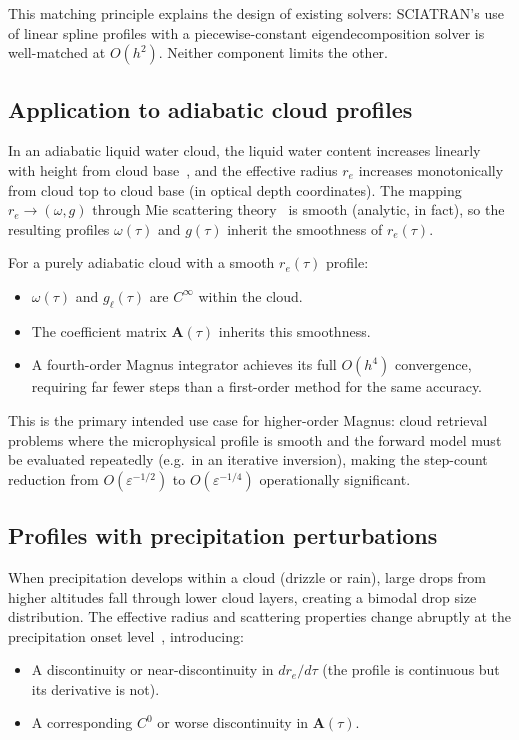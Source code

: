 \documentclass[11pt,a4paper]{article}
\newcommand{\mat}[1]{\mathbf{#1}}
\theoremstyle{definition}
\begin{document}
This matching principle explains the design of existing solvers:
SCIATRAN's use of linear spline profiles with a piecewise-constant
eigendecomposition solver is well-matched at $O(h^2)$.  Neither
component limits the other.

\subsection{Application to adiabatic cloud profiles}\label{sec:adiabatic}

In an adiabatic liquid water cloud, the liquid water content increases
linearly with height from cloud base~\cite{brenguier2000}, and the
effective radius $r_e$ increases monotonically from cloud top to cloud
base (in optical depth coordinates).  The mapping $r_e\to(\omega,g)$
through Mie scattering theory~\cite{hansen1974} is smooth (analytic,
in fact), so the resulting profiles $\omega(\tau)$ and $g(\tau)$ inherit
the smoothness of $r_e(\tau)$.

For a purely adiabatic cloud with a smooth $r_e(\tau)$ profile:
\begin{itemize}[nosep]
\item $\omega(\tau)$ and $g_\ell(\tau)$ are $C^\infty$ within the cloud.
\item The coefficient matrix $\mat{A}(\tau)$ inherits this smoothness.
\item A fourth-order Magnus integrator achieves its full $O(h^4)$
  convergence, requiring far fewer steps than a first-order method for
  the same accuracy.
\end{itemize}

This is the primary intended use case for higher-order Magnus: cloud
retrieval problems where the microphysical profile is smooth and the
forward model must be evaluated repeatedly (e.g.\ in an iterative
inversion), making the step-count reduction from $O(\varepsilon^{-1/2})$
to $O(\varepsilon^{-1/4})$ operationally significant.

\subsection{Profiles with precipitation perturbations}\label{sec:precip}

When precipitation develops within a cloud (drizzle or rain), large
drops from higher altitudes fall through lower cloud layers, creating a
bimodal drop size distribution.  The effective radius and scattering
properties change abruptly at the precipitation onset
level~\cite{pruppacher1997}, introducing:
\begin{itemize}[nosep]
\item A discontinuity or near-discontinuity in $dr_e/d\tau$
  (the profile is continuous but its derivative is not).
\item A corresponding $C^0$ or worse discontinuity in $\mat{A}(\tau)$.
\end{itemize}
\end{document}
